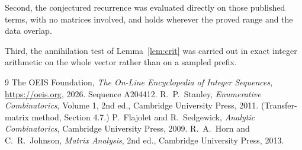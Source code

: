 \documentclass[11pt,a4paper]{article}
\theoremstyle{plain}
\theoremstyle{definition}
\begin{document}
Second, the conjectured recurrence was evaluated directly on those published terms, with no
matrices involved, and holds wherever the proved range and the data overlap.

Third, the annihilation test of Lemma~\ref{lem:crit} was carried out in exact integer
arithmetic on the whole vector rather than on a sampled prefix.

\begin{thebibliography}{9}
 The OEIS Foundation, \emph{The On-Line Encyclopedia of Integer
Sequences}, \url{https://oeis.org}, 2026. Sequence A204412.
 R.~P.~Stanley, \emph{Enumerative Combinatorics}, Volume 1, 2nd ed.,
Cambridge University Press, 2011. (Transfer-matrix method, Section 4.7.)
 P.~Flajolet and R.~Sedgewick, \emph{Analytic Combinatorics}, Cambridge
University Press, 2009.
 R.~A.~Horn and C.~R.~Johnson, \emph{Matrix Analysis}, 2nd ed., Cambridge
University Press, 2013.
\end{thebibliography}
\end{document}
